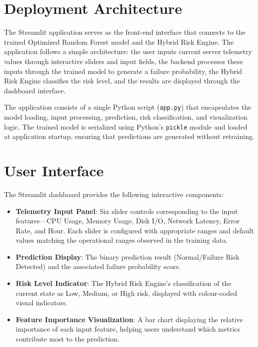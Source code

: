 \documentclass[12pt,letterpaper]{report}
\begin{document}
\section{Deployment Architecture}

The Streamlit application serves as the front-end interface that connects to the trained Optimized Random Forest model and the Hybrid Risk Engine. The application follows a simple architecture: the user inputs current server telemetry values through interactive sliders and input fields, the backend processes these inputs through the trained model to generate a failure probability, the Hybrid Risk Engine classifies the risk level, and the results are displayed through the dashboard interface.

The application consists of a single Python script (\texttt{app.py}) that encapsulates the model loading, input processing, prediction, risk classification, and visualization logic. The trained model is serialized using Python's \texttt{pickle} module and loaded at application startup, ensuring that predictions are generated without retraining.

\section{User Interface}

The Streamlit dashboard provides the following interactive components:

\begin{itemize}
  \item \textbf{Telemetry Input Panel}: Six slider controls corresponding to the input features---CPU Usage, Memory Usage, Disk I/O, Network Latency, Error Rate, and Hour. Each slider is configured with appropriate ranges and default values matching the operational ranges observed in the training data.
  \item \textbf{Prediction Display}: The binary prediction result (Normal/Failure Risk Detected) and the associated failure probability score.
  \item \textbf{Risk Level Indicator}: The Hybrid Risk Engine's classification of the current state as Low, Medium, or High risk, displayed with colour-coded visual indicators.
  \item \textbf{Feature Importance Visualization}: A bar chart displaying the relative importance of each input feature, helping users understand which metrics contribute most to the prediction.
\end{itemize}
\end{document}
